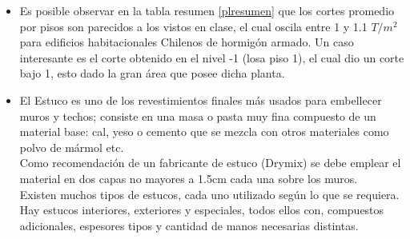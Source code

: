 \documentclass[letterpaper,11pt]{article} %
\begin{document}
\begin{itemize}
    \item Es posible observar en la tabla resumen \ref{plresumen} que los cortes promedio por pisos son parecidos a los vistos en clase, el cual oscila entre 1 y 1.1 $T/m^2$ para edificios habitacionales Chilenos de hormigón armado. Un caso interesante es el corte obtenido en el nivel -1 (losa piso 1), el cual dio un corte bajo 1, esto dado la gran área que posee dicha planta.
    \item El Estuco es uno de los revestimientos finales más usados para embellecer muros y techos; consiste en una masa o pasta muy fina compuesto de un material base: cal, yeso o cemento que se mezcla con otros materiales como polvo de mármol etc. \\
    Como recomendación de un fabricante de estuco (Drymix) se debe emplear el material en dos capas no mayores a 1.5cm cada una sobre los muros.\\
    Existen muchos tipos de estucos, cada uno utilizado según lo que se requiera. Hay estucos interiores, exteriores y especiales, todos ellos con, compuestos adicionales, espesores tipos y cantidad de manos necesarias distintas. %
\end{itemize}
    
\end{document}
